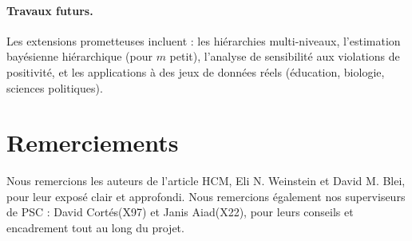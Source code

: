 \documentclass[11pt,a4paper]{article}
\begin{document}
\paragraph{Travaux futurs.}
Les extensions prometteuses incluent : les hiérarchies multi-niveaux, l'estimation bayésienne hiérarchique (pour $m$ petit), l'analyse de sensibilité aux violations de positivité, et les applications à des jeux de données réels (éducation, biologie, sciences politiques).

\section*{Remerciements}

Nous remercions les auteurs de l'article HCM, Eli N. Weinstein et David M. Blei, pour leur exposé clair et approfondi.
Nous remercions également nos superviseurs de PSC : David Cortés(X97) et Janis Aiad(X22), pour leurs conseils et encadrement tout au long du projet.

\end{document}
